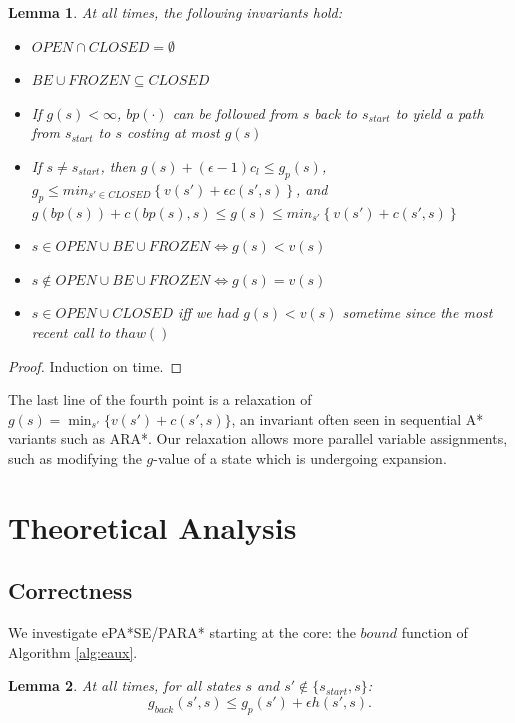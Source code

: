 \documentclass[letterpaper]{article}
\newtheorem{lemma}{Lemma}
\begin{document}
\begin{lemma}
\label{lem:prop}
At all times, the following invariants hold:
\begin{itemize}
\item $OPEN\cap CLOSED = \emptyset$
\item $BE\cup FROZEN \subseteq CLOSED$
\item If $g(s)<\infty$, $bp(\cdot)$ can be followed from $s$ back to $s_{start}$ to yield a path from $s_{start}$ to $s$ costing at most $g(s)$
\item If $s\ne s_{start}$, then $g(s) + (\epsilon-1)c_l \le g_p(s)$,
\\$g_p \le min_{s'\in CLOSED}\left\{v(s') + \epsilon c(s',s)\right\}$, and
\\$g(bp(s)) + c(bp(s),s) \le g(s) \le min_{s'}\left\{v(s') + c(s',s)\right\}$
\item $s\in OPEN\cup BE\cup FROZEN \Leftrightarrow g(s) < v(s)$
\item $s\notin OPEN\cup BE\cup FROZEN \Leftrightarrow g(s) = v(s)$
\item $s\in OPEN\cup CLOSED$ iff we had $g(s)<v(s)$ sometime since the most recent call to $thaw()$
\end{itemize}
\end{lemma}

\begin{proof}
Induction on time.
\end{proof}

The last line of the fourth point is a relaxation of $g(s) = \min_{s'}\{v(s') + c(s',s)\}$, an invariant often seen in sequential A* variants such as ARA*. Our relaxation allows more parallel variable assignments, such as modifying the $g$-value of a state which is undergoing expansion.

\section{Theoretical Analysis}

\subsection{Correctness}

We investigate ePA*SE/PARA* starting at the core: the $bound$ function of Algorithm \ref{alg:eaux}.

\begin{lemma}
\label{lem:indep}
At all times, for all states $s$ and $s'\notin \{s_{start},s\}$:
\[g_{back}(s',s) \le g_p(s') + \epsilon h(s',s).\]
\end{lemma}
\end{document}
